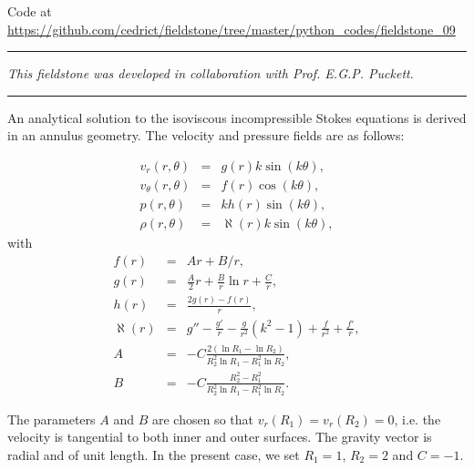 

\begin{center}
Code at \url{https://github.com/cedrict/fieldstone/tree/master/python_codes/fieldstone_09}
\end{center}

\par\noindent\rule{\textwidth}{0.4pt}

{\sl This fieldstone was developed in collaboration with Prof. E.G.P. Puckett}. 

\par\noindent\rule{\textwidth}{0.4pt}

An analytical solution to the
isoviscous incompressible Stokes equations is derived in an annulus geometry.
The velocity and pressure fields are as follows:

\begin{eqnarray}
v_r(r,\theta)     &=&  g(r) k \sin(k\theta), \\
v_\theta(r,\theta)&=&  f(r) \cos(k \theta), \\ 
p(r,\theta)       &=&  k h(r) \sin(k \theta), \\
\rho (r,\theta)   &=& \aleph(r) k \sin (k \theta), 
\end{eqnarray}
with
\begin{eqnarray}
f(r)&=&Ar+B/r, \\
g(r) &=& \frac{A}{2}r  +  \frac{B}{r} \ln r + \frac{C}{r}, \\
h(r)&=& \frac{2g(r)-f(r)}{r},  \\
\aleph(r) &=& g'' - \frac{g'}{r}  - \frac{g}{r^2} (k^2 - 1)  + \frac{f}{r^2}   + \frac{f'}{r}, \\
A &=& -C\frac{2(\ln R_1 - \ln R_2)} { R_2^2 \ln R_1  - R_1^2 \ln R_2}, \\
B &=& -C \frac{R_2^2-R_1^2}{R_2^2 \ln R_1 - R_1^2 \ln R_2}.
\end{eqnarray}

The parameters $A$ and $B$ are chosen so that $v_r(R_1)=v_r(R_2)=0$, i.e.
the velocity is tangential to both inner and outer surfaces.
The gravity vector is radial and of unit length.
In the present case, we set $R_1=1$, $R_2=2$ and $C=-1$. 

